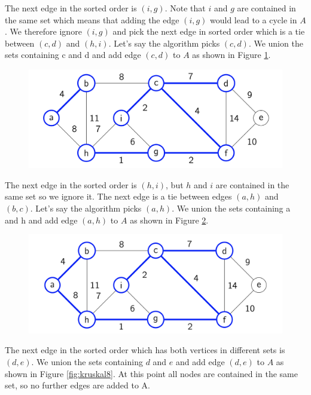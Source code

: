 \documentclass [12pt]{article}
\theoremstyle{definition}
\begin{document}
The next edge in the sorted order is $(i, g)$. Note that $i$ and $g$ are contained in the same set which means that adding the edge $(i, g)$ would lead to a cycle in $A$. We therefore ignore $(i, g)$ and pick the next edge in sorted order which is a tie between $(c, d)$ and $(h, i)$. Let's say the algorithm picks $(c, d)$. We union the sets containing c and d and add edge $(c, d)$ to $ A$ as shown in Figure \ref{fig:kruskal6}.

\begin{figure}[h!]
\centering
\includegraphics[scale=0.8]{kruskal6.png}
\caption{}
\label{fig:kruskal6}
\end{figure}

The next edge in the sorted order is $(h, i)$, but $h$ and $i$ are contained in the same set so we ignore it. The next edge is a tie between edges $(a, h)$ and $(b, c)$. Let's say the algorithm picks $(a, h)$. We union the sets containing a and h and add edge $(a, h)$ to $A$ as shown in Figure \ref{fig:kruskal7}.


\begin{figure}[h!]
\centering
\includegraphics[scale=0.8]{kruskal7.png}
\caption{}
\label{fig:kruskal7}
\end{figure}

The next edge in the sorted order which has both vertices in different sets is $(d, e)$. We union the sets containing $ d$ and $e$ and add edge $(d, e)$ to $A$ as shown in Figure \ref{fig:kruskal8}. At this point all nodes are contained in the same set, so no further edges are added to A.
\end{document}
